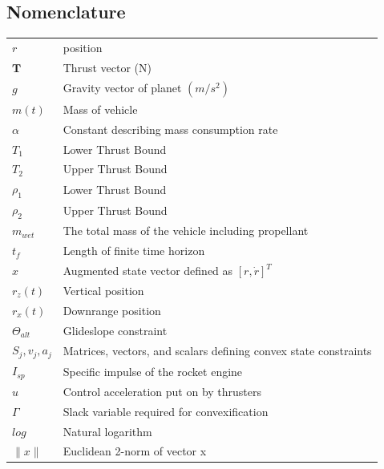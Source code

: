 \documentclass[journal]{new-aiaa}
\begin{document}
\begin{singlespace}
\section*{Nomenclature}
{\renewcommand\arraystretch{1.0}
\noindent\begin{longtable*}{@{}l @{\quad=\quad} l@{}}
$r$  & position \\
$\textbf{T}$  &Thrust vector (N)\\
$g$   		&Gravity vector of planet $(m/s^2)$ \\
$m(t)$  	&Mass of vehicle\\
$\alpha$ 	&Constant describing mass consumption rate \\
$T_1$   & Lower Thrust Bound\\
$T_2$   & Upper Thrust Bound\\
$\rho_1$   	& Lower Thrust Bound  \\
$\rho_2$	& Upper Thrust Bound\\
$m_{wet}$		& The total mass of the vehicle including propellant\\
$t_f$		& Length of finite time horizon\\
$x$		& Augmented state vector defined as $[r, \dot{r}]^T$\\
$r_z(t)$	& Vertical position \\
$r_x(t)$	& Downrange position \\
$\Theta_{alt}$		& Glideslope constraint \\
$S_j, v_j, a_j$		& Matrices, vectors, and scalars defining convex state constraints\\
$I_{sp}$		& Specific impulse of the rocket engine\\
$u$		& Control acceleration put on by thrusters\\
$\Gamma$		& Slack variable required for convexification \\
$log$		& Natural logarithm\\
$\|x\|$		& Euclidean 2-norm of vector x\\
\end{longtable*}}


\end{singlespace}
\end{document}
